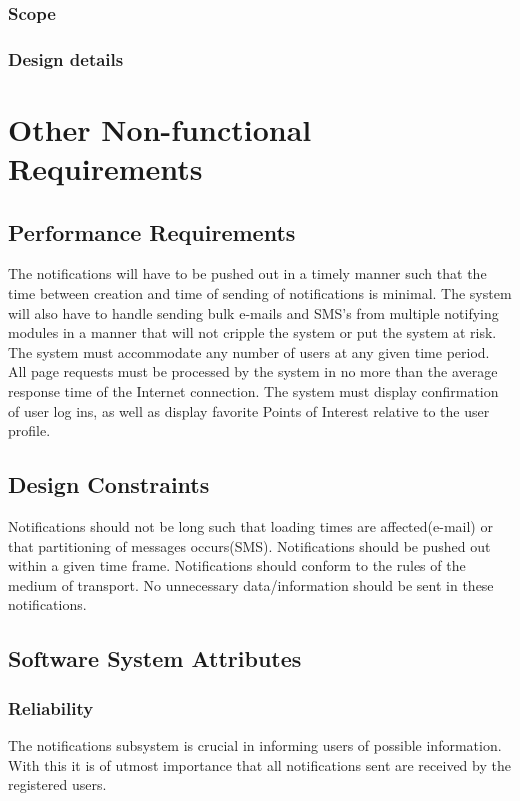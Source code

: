 \documentclass{article}
\begin{document}
\subsubsection{Scope}

\subsubsection{Design details}
\newpage
\section{Other Non-functional Requirements}
\subsection{Performance Requirements}
The notifications will have to be pushed out in a timely manner such that the time between creation and time of sending of notifications is minimal.
\newline
The system will also have to handle sending bulk e-mails and SMS's from multiple notifying modules in a manner that will not cripple the system or put the system at risk.
\newline
The system must accommodate any number of users at any given time period. All page requests must be processed by the system in no more than the average response time of the Internet connection. 
\newline
The system must display confirmation of user log ins, as well as display favorite Points of Interest relative to the user profile.
\subsection{Design Constraints}

\begin{flushleft}
    Notifications should not be long such that loading times are affected(e-mail) or that partitioning of messages occurs(SMS). Notifications should be pushed out within a given time frame. Notifications should conform to the rules of the medium of transport. No unnecessary data/information should be sent in these notifications. 
    \end{flushleft}

\subsection{Software System Attributes}
\subsubsection{Reliability}    
    \begin{flushleft}
    The notifications subsystem is crucial in informing users of possible information. With this it is of utmost importance that all notifications sent are received by the registered users.
    \end{flushleft}
    
\end{document}
